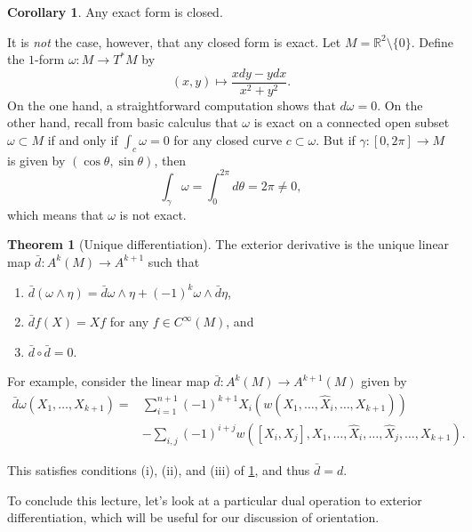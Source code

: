\documentclass[10pt,letterpaper,cm]{nupset}
\theoremstyle{definition}
\theoremstyle{theorem}
\newtheorem{theorem}[definition]{Theorem}
\newtheorem{corollary}[definition]{Corollary}
\theoremstyle{remark}
\newcommand{\R}{\mathbb R}
\newcommand{\1}{\mathbf{1}}
\newcommand{\0}{\vec 0}
\begin{document}
\begin{corollary}
Any exact form is closed.
\end{corollary}

\smallskip


It is \emph{not} the case, however, that any closed form is exact. Let $M=  \R^2 \setminus \{0\}$. Define the $1$-form $\omega : M \to T^{\ast}M$ by $$(x, y) \mapsto \frac{xdy - y dx}{x^2 + y^2}.$$ On the one hand, a straightforward computation shows that $d \omega =0$. On the other hand, recall from basic calculus that $\omega$ is exact on a connected open subset $\omega \subset M$ if and only if $\int_c \omega =0$ for any closed curve $c \subset \omega$. But if $\gamma : [0, 2\pi] \to M$ is given by $\left(\cos \theta, \sin \theta\right)$, then  
\[\label{eqn:nexact}
 \int_{\gamma} \omega = \int_{0}^{2\pi} d\theta = 2\pi \ne 0 , \tag{$\dagger$}
\] which means that $\omega$ is not exact.


\begin{theorem}[Unique differentiation]\label{UD}
The exterior derivative is the unique linear map $\bar{d} : A^k(M) \to A^{k+1}$ such that
\begin{enumerate}[label=(\roman*)]
\item $\bar{d}( \omega \wedge \eta) = \bar{d} \omega \wedge \eta + ({-1})^k\omega \wedge \bar{d} \eta$,
\item $\bar{d}{f}(X)= X{f}$ for any $f\in C^{\infty}(M)$, and 
\item $\bar{d} \circ \bar{d} = 0$.
\end{enumerate}
\end{theorem}

\medskip

For example, consider the linear map $\bar{d} : A^k(M) \to A^{k+1}(M)$ given by  
\begin{align*} 
\bar{d}{\omega}\left(X_1, \ldots, X_{k+1}\right)  = 
&\sum_{i=1}^{n+1}(-1)^{k+1} X_{i}\left(w\left(X_{1}, \ldots, \widehat{X}_{i}, \ldots, X_{k+1}\right)\right)\\
&-\sum_{i, j}(-1)^{i+j} w\left(\left[X_{i}, X_{j}\right], X_{1}, \ldots, \widehat{X}_{i}, \ldots, \widehat{X}_{j}, \ldots, X_{k+1}\right).
\end{align*}

This satisfies conditions (i), (ii), and (iii) of \cref{UD}, and thus $\bar{d} = d$.


\bigskip

To conclude this lecture, let's look at a particular dual operation to exterior differentiation, which will be useful for our discussion of orientation. 
\end{document}
